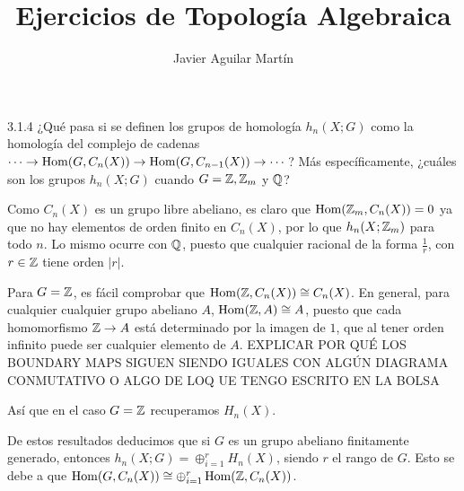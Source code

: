 \documentclass[twoside]{article}
\begin{document}
\title{Ejercicios de Topología Algebraica}
\author{Javier Aguilar Martín}
\maketitle

\begin{ejercicio}{3.1.4}
¿Qué pasa si se definen los grupos de homología $h_n(X;G)$ como la homología del complejo de cadenas $\cdots\to\operatorname{Hom}(G,C_n(X))\to\operatorname{Hom}(G,C_{n-1}(X))\to\cdots$? Más específicamente, ¿cuáles son los grupos $h_n(X;G)$ cuando $G=\mathbb{Z},\mathbb{Z}_m$ y $\mathbb{Q}$?
\end{ejercicio}
\begin{solucion}
Como $C_n(X)$ es un grupo libre abeliano, es claro que $\operatorname{Hom}(\mathbb{Z}_m,C_n(X))=0$ ya que no hay elementos de orden finito en $C_n(X)$, por lo que $h_n(X;\mathbb{Z}_m)$ para todo $n$. Lo mismo ocurre con $\mathbb{Q}$, puesto que cualquier racional de la forma $\frac{1}{r}$, con $r\in\mathbb{Z}$ tiene orden $|r|$. 

Para $G=\mathbb{Z}$, es fácil comprobar que $\operatorname{Hom}(\mathbb{Z},C_n(X))\cong C_n(X)$. En general, para cualquier cualquier grupo abeliano $A$, $\operatorname{Hom}(\mathbb{Z},A)\cong A$, puesto que cada homomorfismo $\mathbb{Z}\to A$ está determinado por la imagen de $1$, que al tener orden infinito puede ser cualquier elemento de $A$. EXPLICAR POR QUÉ LOS BOUNDARY MAPS SIGUEN SIENDO IGUALES CON ALGÚN DIAGRAMA CONMUTATIVO O ALGO DE LOQ UE TENGO ESCRITO EN LA BOLSA

Así que en el caso $G=\mathbb{Z}$ recuperamos $H_n(X)$. 

De estos resultados deducimos que si $G$ es un grupo abeliano finitamente generado, entonces $h_n(X;G)=\oplus_{i=1}^rH_n(X)$, siendo $r$ el rango de $G$. Esto se debe a que $\operatorname{Hom}(G,C_n(X))\cong\oplus_{i=1}^r\operatorname{Hom}(\mathbb{Z},C_n(X))$. 

\end{solucion}
\end{document}
